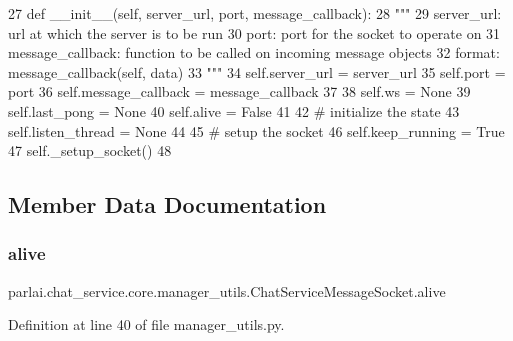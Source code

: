 \begin{DoxyCode}
27     \textcolor{keyword}{def }\_\_init\_\_(self, server\_url, port, message\_callback):
28         \textcolor{stringliteral}{"""}
29 \textcolor{stringliteral}{        server\_url:           url at which the server is to be run}
30 \textcolor{stringliteral}{        port:                 port for the socket to operate on}
31 \textcolor{stringliteral}{        message\_callback:     function to be called on incoming message objects}
32 \textcolor{stringliteral}{                              format: message\_callback(self, data)}
33 \textcolor{stringliteral}{        """}
34         self.server\_url = server\_url
35         self.port = port
36         self.message\_callback = message\_callback
37 
38         self.ws = \textcolor{keywordtype}{None}
39         self.last\_pong = \textcolor{keywordtype}{None}
40         self.alive = \textcolor{keyword}{False}
41 
42         \textcolor{comment}{# initialize the state}
43         self.listen\_thread = \textcolor{keywordtype}{None}
44 
45         \textcolor{comment}{# setup the socket}
46         self.keep\_running = \textcolor{keyword}{True}
47         self.\_setup\_socket()
48 
\end{DoxyCode}


\subsection{Member Data Documentation}
\mbox{\label{classparlai_1_1chat__service_1_1core_1_1manager__utils_1_1ChatServiceMessageSocket_a56247cb3af9fce17b726e63f43d30914}} 
\subsubsection{\texorpdfstring{alive}{alive}}
{\footnotesize\ttfamily parlai.\+chat\+\_\+service.\+core.\+manager\+\_\+utils.\+Chat\+Service\+Message\+Socket.\+alive}



Definition at line 40 of file manager\+\_\+utils.\+py.

